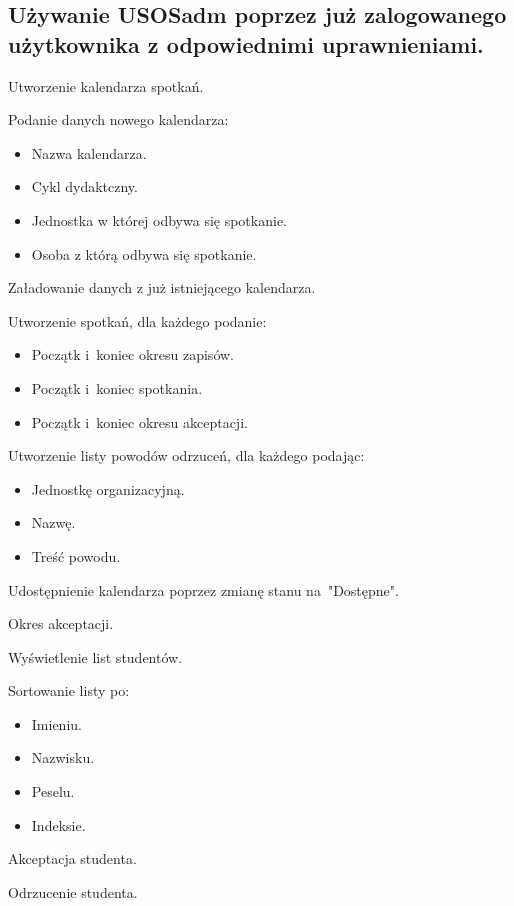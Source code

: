 \documentclass[licencjacka]{pracamgr}
\begin{document}
\subsection{Używanie USOSadm poprzez już zalogowanego użytkownika z odpowiednimi uprawnieniami.}
	\begin{step}
		\item Utworzenie kalendarza spotkań.
			\begin{step}
				\item Podanie danych nowego kalendarza:
					\begin{itemize}
						\item Nazwa kalendarza.
						\item Cykl dydaktczny.
						\item Jednostka w której odbywa się spotkanie.
						\item Osoba z którą odbywa się spotkanie.
					\end{itemize} 
				\item Załadowanie danych z już istniejącego kalendarza.
			\end{step}
				\item Utworzenie spotkań, dla każdego podanie:
					\begin{itemize}
						\item Początk i~koniec okresu zapisów.
						\item Początk i~koniec spotkania.
						\item Początk i~koniec okresu akceptacji.
					\end{itemize}
				\item Utworzenie listy powodów odrzuceń, dla każdego podając:
					\begin{itemize}
						\item Jednostkę organizacyjną.
						\item Nazwę.
						\item Treść powodu.
					\end{itemize}
		\item Udostępnienie kalendarza poprzez zmianę stanu na~"Dostępne".
		\item Okres akceptacji.
			\begin{step}
				\item Wyświetlenie list studentów.
					\begin{step}
						\item Sortowanie listy po:
							\begin{itemize}
								\item Imieniu.
								\item Nazwisku.
								\item Peselu.
								\item Indeksie.
						 	\end{itemize}
					\end{step}
				\item Akceptacja studenta.
				\item Odrzucenie studenta. 
			\end{step}
	\end{step}
	
\end{document}
